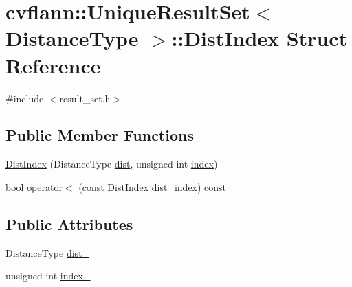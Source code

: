 \hypertarget{structcvflann_1_1UniqueResultSet_1_1DistIndex}{\section{cvflann\-:\-:Unique\-Result\-Set$<$ Distance\-Type $>$\-:\-:Dist\-Index Struct Reference}
\label{structcvflann_1_1UniqueResultSet_1_1DistIndex}
}


{\ttfamily \#include $<$result\-\_\-set.\-h$>$}

\subsection*{Public Member Functions}
\begin{DoxyCompactItemize}
\item 
\hyperlink{structcvflann_1_1UniqueResultSet_1_1DistIndex_ab6474351fb753109d0fd88b543a1e479}{Dist\-Index} (Distance\-Type \hyperlink{legacy_8hpp_ae895c2003a87eda49126845b7ac3688e}{dist}, unsigned int \hyperlink{core__c_8h_a750b5d744c39a06bfb13e6eb010e35d0}{index})
\item 
bool \hyperlink{structcvflann_1_1UniqueResultSet_1_1DistIndex_ae2755babdbaa48d8af29fe7cdf40cae2}{operator$<$} (const \hyperlink{structcvflann_1_1UniqueResultSet_1_1DistIndex}{Dist\-Index} dist\-\_\-index) const 
\end{DoxyCompactItemize}
\subsection*{Public Attributes}
\begin{DoxyCompactItemize}
\item 
Distance\-Type \hyperlink{structcvflann_1_1UniqueResultSet_1_1DistIndex_a844fa1a0eb8644069bca6c4a4e285e24}{dist\-\_\-}
\item 
unsigned int \hyperlink{structcvflann_1_1UniqueResultSet_1_1DistIndex_af78cbee8bf5dd4249adbf52674022178}{index\-\_\-}
\end{DoxyCompactItemize}



